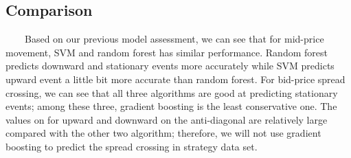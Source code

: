 \documentclass[11pt]{article}
\begin{document}
  \begin{table} [!htb]
    \small
\caption{Gradient Boosting: Bid-Ask Spread Crossing Measures}
\centering
{}
  \end{table}

\subsection{Comparison}
\ \ \ \ Based on our previous model assessment, we can see that for mid-price movement, SVM and random forest has similar performance. Random forest predicts downward and stationary events more accurately while SVM predicts upward event a little bit more accurate than random forest. For bid-price spread crossing, we can see that all three algorithms are good at predicting stationary events; among these three, gradient boosting is the least conservative one. The values on for upward and downward on the anti-diagonal are relatively large compared with the other two algorithm; therefore, we will not use gradient boosting to predict the spread crossing in strategy data set.   
\end{document}
